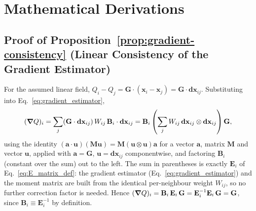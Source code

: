 
\section{Mathematical Derivations}

\subsection{Proof of Proposition~\ref{prop:gradient-consistency} (Linear Consistency of the Gradient Estimator)}
\label{app:gradient-consistency-proof}
For the assumed linear field, $Q_i - Q_j = \mathbf G\cdot(\mathbf x_i -
\mathbf x_j) = \mathbf G \cdot \mathbf{dx}_{ij}$. Substituting into
Eq.~\eqref{eq:gradient_estimator},
\begin{equation}
  (\grad Q)_i = \sum_j (\mathbf G\cdot\mathbf{dx}_{ij})\, W_{ij}\, \mathbf B_i \cdot \mathbf{dx}_{ij}
  = \mathbf B_i \left(\sum_j W_{ij}\, \mathbf{dx}_{ij}\otimes\mathbf{dx}_{ij}\right) \mathbf G ,
\end{equation}
using the identity $(\mathbf a\cdot\mathbf u)(\mathbf M\mathbf u) =
\mathbf M(\mathbf u\otimes\mathbf u)\mathbf a$ for a vector $\mathbf a$,
matrix $\mathbf M$ and vector $\mathbf u$, applied with $\mathbf a =
\mathbf G$, $\mathbf u=\mathbf{dx}_{ij}$ componentwise, and factoring
$\mathbf B_i$ (constant over the sum) out to the left. The sum in
parentheses is exactly $\mathbf E_i$ of Eq.~\eqref{eq:E_matrix_def}: the
gradient estimator (Eq.~\eqref{eq:gradient_estimator}) and the moment
matrix are built from the identical per-neighbour weight $W_{ij}$, so no
further correction factor is needed. Hence
$(\grad Q)_i = \mathbf B_i\, \mathbf E_i\, \mathbf G = \mathbf E_i^{-1}\mathbf E_i\, \mathbf G = \mathbf G$,
since $\mathbf B_i \equiv \mathbf E_i^{-1}$ by definition.

